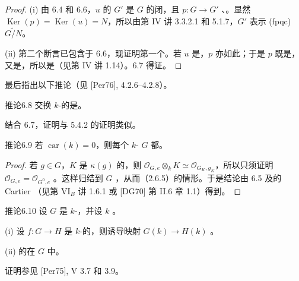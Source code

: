 \begin{proof}
(i) 由 6.4 和 6.6，$u$ 的 $G'$ 是 $G$ 的闭，且 $p:G\to G'$ 、。显然 $\operatorname{Ker}(p)=\operatorname{Ker}(u)=N$，所以由第 IV 讲 3.3.2.1 和 5.1.7，$G'$ 表示 (fpqc)  $\widetilde{G/N}$。

(ii) 第二个断言已包含于 6.6，现证明第一个。若 $u$ 是，$p$ 亦如此；于是 $p$ 既是，又是，所以是（见第 IV 讲 1.14）。6.7 得证。
\end{proof}
最后指出以下推论（见 [Per76], 4.2.6--4.2.8）。
\begin{SGAresult}{推论}{6.8}
交换 $k$-的是。
\end{SGAresult}
结合 6.7，证明与 5.4.2 的证明类似。
\begin{SGAresult}{推论}{6.9}
若 $\operatorname{car}(k)=0$，则每个 $k$- $G$ 都。
\end{SGAresult}
\begin{proof}
若 $g\in G$，$K$ 是 $\kappa(g)$ 的，则 $\mathcal O_{G,e}\otimes_k K\simeq\mathcal O_{G_K,g_K}$，所以只须证明 $\mathcal O_{G,e}=\mathcal O_{G^0,e}$ 。这样归结到 $G$ ，从而（2.6.5）的情形。于是结论由 6.5 及的 Cartier （见第 VI$_B$ 讲 1.6.1 或 [DG70] 第 II.6 章 1.1）得到。
\end{proof}
\begin{SGAresult}{推论}{6.10}
设 $G$ 是 $k$-，并设 $k$ 。

(i) 设 $f:G\to H$ 是 $k$-的，则诱导映射 $G(k)\to H(k)$ 。

(ii) 的在 $G$ 中。
\end{SGAresult}
证明参见 [Per75], V 3.7 和 3.9。

